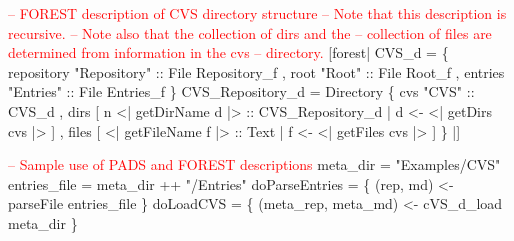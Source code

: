 \begin{code}

\textcolor{red}{-- FOREST description of CVS directory structure}
\textcolor{red}{-- Note that this description is recursive.}
\textcolor{red}{-- Note also that the collection of dirs and the 
-- collection of files are determined from information in the cvs 
-- directory.}
[forest|  CVS_d = 
              \{ repository  "Repository" :: File Repository_f
              , root        "Root"       :: File Root_f
              , entries     "Entries"    :: File Entries_f
              \}
\mbox{}             
          CVS_Repository_d = Directory
             \{ cvs          "CVS"                 :: CVS_d
             , dirs         [ n  <| getDirName  d |> :: CVS_Repository_d | d <- <| getDirs  cvs |> ]
             , files        [ <| getFileName f |> :: Text       | f <- <| getFiles cvs |> ]
             \} |]

\end{code}
\begin{code}
\textcolor{red}{-- Sample use of PADS and FOREST descriptions}
meta_dir     = "Examples/CVS"
entries_file = meta_dir ++ "/Entries"
doParseEntries =  \{
 (rep, md)  <- parseFile entries_file
\}
\mbox{}             
doLoadCVS =  \{
   (meta_rep, meta_md) <- cVS_d_load meta_dir
\}
\end{code}